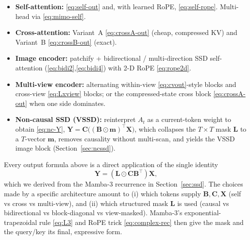 \documentclass[11pt,a4paper]{article}
\begin{document}
\begin{itemize}
  \item \textbf{Self-attention:} \eqref{eq:self-out} and, with
        learned RoPE, \eqref{eq:self-rope}. Multi-head via
        \eqref{eq:mimo-self}.
  \item \textbf{Cross-attention:} Variant~A \eqref{eq:crossA-out}
        (cheap, compressed KV) and Variant~B \eqref{eq:crossB-out}
        (exact).
  \item \textbf{Image encoder:} patchify + bidirectional /
        multi-direction SSD self-attention
        (\eqref{eq:bidi2},\eqref{eq:bidi4}) with 2-D RoPE
        \eqref{eq:rope2d}.
  \item \textbf{Multi-view encoder:} alternating within-view
        \eqref{eq:cvout}-style blocks and cross-view
        \eqref{eq:Lxview} blocks; or the compressed-state cross
        block \eqref{eq:crossA-out} when one side dominates.
  \item \textbf{Non-causal SSD (VSSD):} reinterpret $A_t$ as a
        current-token weight to obtain \eqref{eq:nc-Y},
        $\bm{Y} = \bm{C}\bigl((\bm{B}\odot\bm{m})^\top\bm{X}\bigr)$,
        which collapses the $T\times T$ mask $\bm{L}$ to a
        $T$-vector $\bm{m}$, removes causality without multi-scan,
        and yields the VSSD image block (Section~\ref{sec:ncssd}).
\end{itemize}

Every output formula above is a direct application of the single
identity
\begin{equation*}
  \bm{Y} = (\bm{L}\odot\bm{C}\bm{B}^\top)\bm{X},
\end{equation*}
which we derived from the Mamba-3 recurrence in
Section~\ref{sec:ssd}. The choices made by a specific architecture
amount to (i) which tokens supply $\bm{B},\bm{C},\bm{X}$ (self vs
cross vs multi-view), and (ii) which structured mask $\bm{L}$ is used
(causal vs bidirectional vs block-diagonal vs view-masked). Mamba-3's
exponential-trapezoidal rule \eqref{eq:L3} and RoPE trick
\eqref{eq:complex-rec} then give the mask and the query/key its final,
expressive form.



\end{document}
